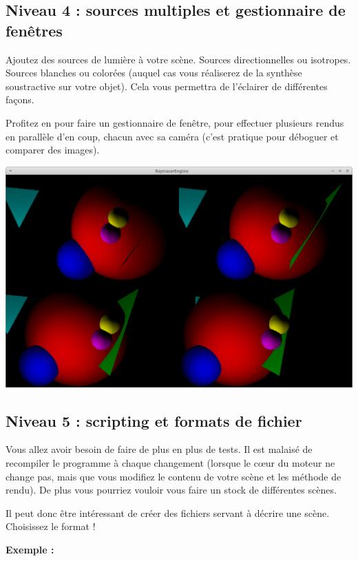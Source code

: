 \documentclass[a4paper, 11pt]{article}
\begin{document}
\subsection*{Niveau 4 : sources multiples et gestionnaire de fenêtres}

Ajoutez des sources de lumière à votre scène. Sources directionnelles ou isotropes. Sources blanches ou colorées (auquel cas vous réaliserez de la synthèse soustractive sur votre objet). Cela vous permettra de l'éclairer de différentes façons.  
  
Profitez en pour faire un gestionnaire de fenêtre, pour effectuer plusieurs rendus en parallèle d'en coup, chacun avec sa caméra (c'est pratique pour déboguer et comparer des images).  

\begin{center}
\includegraphics[scale=0.2]{window_manager4.png} 
\end{center}

\subsection*{Niveau 5 : scripting et formats de fichier}  
  
Vous allez avoir besoin de faire de plus en plus de tests. Il est malaisé de recompiler le programme à chaque changement (lorsque le cœur du moteur ne change pas, mais que vous modifiez le contenu de votre scène et les méthode de rendu). De plus vous pourriez vouloir vous faire un stock de différentes scènes.  
  
Il peut donc être intéressant de créer des fichiers servant à décrire une scène. Choisissez le format !  
  
\textbf{Exemple :}
  
\end{document}
